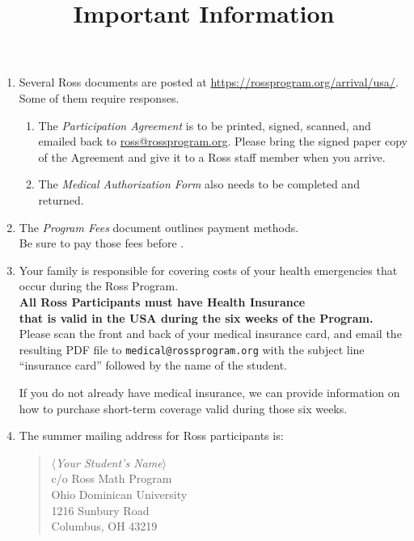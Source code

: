 \documentclass[11pt]{ross}
\title{Important Information}
\newcommand{\spa}{\hspace*{1cm}}
\newcommand{\spz}{\hspace*{5mm}}
\begin{document}
\maketitle
 \begin{enumerate}[label=(\arabic*),itemsep=2em,topsep=-1em]
\item Several Ross documents are posted at \url{https://rossprogram.org/arrival/usa/}.  \\
Some of them require responses.  
 \begin{enumerate}[label=(\alph*),itemsep=0.5em,topsep=0em]
\item The {\it Participation Agreement} is to be printed, signed, scanned, and emailed back to 
\href{mailto:ross@rossprogram.org}{ross@rossprogram.org}.  Please bring the signed paper copy of the Agreement and give it to a Ross staff member when you arrive. 
\item The {\it Medical Authorization Form} also needs to be completed and returned.
\end{enumerate}

\item The \textit{Program Fees} document outlines payment methods.  \\
\spa Be sure to pay those fees before \feeduedate.

\item Your family is responsible for covering costs of your health
emergencies that occur during the Ross Program.\\
\spz  \textbf{All Ross Participants must have Health Insurance \\
\spz that is valid in the USA during the six weeks of the Program.} \\[5pt]
   Please scan the front and back of your medical insurance card, and email the resulting PDF file to
\texttt{medical@rossprogram.org} with the subject line ``insurance card''
followed by the name of the student. 

If you do not already have medical insurance, we can provide information on how to purchase short-term coverage valid during those six weeks.

\item The summer mailing address for Ross participants is:
\begin{quote}
\textit{$\langle$Your Student's Name$\rangle$} \\
c/o Ross Math Program\\
Ohio Dominican University \\
1216 Sunbury Road \\
Columbus, OH 43219
\end{quote}


\end{enumerate}
\end{document}

